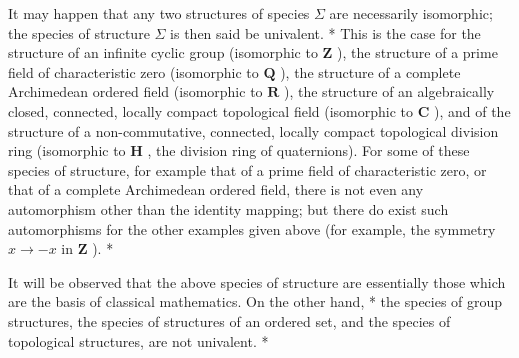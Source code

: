 It may happen that any two structures of species \(\Sigma\) are necessarily isomorphic; the species of structure \(\Sigma\) is then said be univalent. * This is the case for the structure of an infinite cyclic group (isomorphic to \(\mathbf{Z}\) ), the structure of a prime field of characteristic zero (isomorphic to \(\mathbf{Q}\) ), the structure of a complete Archimedean ordered field (isomorphic to \(\mathbf{R}\) ), the structure of an algebraically closed, connected, locally compact topological field (isomorphic to \(\mathbf{C}\) ), and of the structure of a non-commutative, connected, locally compact topological division ring (isomorphic to \(\mathbf{H}\) , the division ring of quaternions). For some of these species of structure, for example that of a prime field of characteristic zero, or that of a complete Archimedean ordered field, there is not even any automorphism other than the identity mapping; but there do exist such automorphisms for the other examples given above (for example, the symmetry \(x \to -x\) in \(\mathbf{Z}\) ). *

It will be observed that the above species of structure are essentially those which are the basis of classical mathematics. On the other hand, * the species of group structures, the species of structures of an ordered set, and the species of topological structures, are not univalent. *

